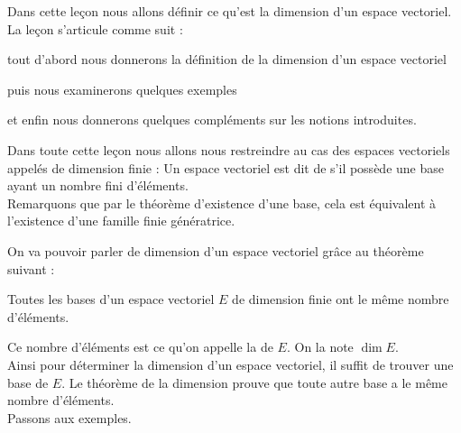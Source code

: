 






\debuttexte


\diapo  

\change
Dans cette le\c{c}on nous allons définir ce qu'est la dimension d'un espace vectoriel. La le\c{c}on s'articule comme suit :

\change
tout d'abord nous donnerons la définition de la dimension d'un espace vectoriel

\change
puis nous examinerons quelques exemples

\change
et enfin nous donnerons quelques compléments sur les notions introduites.

\diapo


Dans toute cette le\c{c}on nous allons nous restreindre au cas des 
espaces vectoriels appelés de dimension finie :
Un espace vectoriel est dit de  s'il 
possède une base ayant un nombre fini d'éléments.\\

Remarquons que par le théorème d'existence d'une base, cela est équivalent à l'existence d'une 
famille finie génératrice.


\change


On va pouvoir parler de  dimension d'un espace vectoriel grâce au théorème suivant :

Toutes les bases d'un espace vectoriel $E$ de dimension 
finie ont le même nombre d'éléments. 



\change

Ce nombre d'éléments est ce qu'on appelle la  de $E$. On la note $\dim E$.\\



Ainsi pour déterminer la dimension d'un espace vectoriel, 
il suffit de trouver une base de $E$.
Le théorème  de la dimension prouve que toute autre base a le même nombre d'éléments.\\



\diapo
Passons aux exemples.

